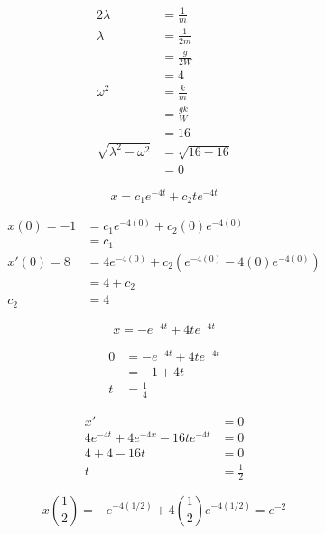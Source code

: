 \documentclass{article}
\begin{document}
\begin{align*}
  2 \lambda                   & = \frac{1}{m}    \\
  \lambda                     & = \frac{1}{2m}   \\
                              & = \frac{g}{2 W}  \\
                              & = 4              \\
  \omega^2                    & = \frac{k}{m}    \\
                              & = \frac{g k}{W}  \\
                              & = 16             \\
  \sqrt{\lambda^2 - \omega^2} & = \sqrt{16 - 16} \\
                              & = 0
\end{align*}

\[x = c_1 e^{-4t} + c_2 t e^{-4t}\]

\begin{align*}
  x(0) = -1 & = c_1 e^{-4 (0)} + c_2 (0) e^{-4 (0)}                \\
            & = c_1                                                \\
  x'(0) = 8 & = 4 e^{-4 (0)} + c_2 (e^{-4 (0)} - 4 (0) e^{-4 (0)}) \\
            & = 4 + c_2                                            \\
  c_2       & = 4
\end{align*}

\[x = -e^{-4t} + 4 t e^{-4t}\]

\begin{align*}
  0 & = -e^{-4t} + 4te^{-4t} \\
    & = -1 + 4t              \\
  t & = \frac{1}{4}
\end{align*}

\begin{align*}
  x'                               & = 0           \\
  4e^{-4t} + 4e^{-4x} - 16te^{-4t} & = 0           \\
  4 + 4 - 16t                      & = 0           \\
  t                                & = \frac{1}{2}
\end{align*}

\[x \left( \frac{1}{2} \right) = -e^{-4 (1 / 2)} + 4 \left( \frac{1}{2} \right) e^{-4 (1/2)} = e^{-2}\]
\end{document}
